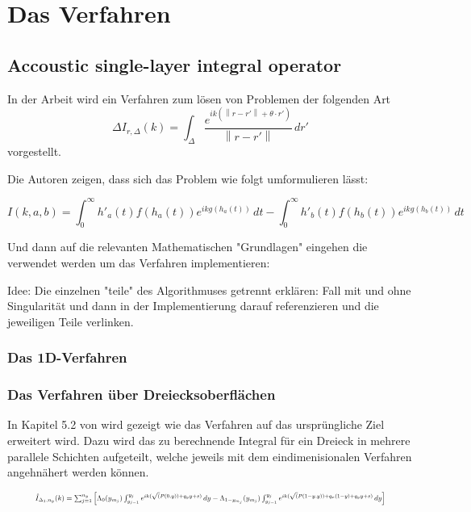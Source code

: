 \chapter{Das Verfahren}

\section{Accoustic single-layer integral operator}

In der Arbeit  wird ein Verfahren zum lösen von Problemen der folgenden Art
\begin{equation}
    \Delta
    I_{r,\Delta}(k) = \int_{\Delta}^{}  \frac{e^{ik(\left\lVert r-r'\right\rVert + \theta \cdot r')}}{\left\lVert r-r'\right\rVert} \,dr'
\end{equation}
vorgestellt.

Die Autoren zeigen, dass sich das Problem wie folgt umformulieren lässt:

\begin{equation}
    I(k,a,b) = \int_{0}^{\infty} h'_a(t)f(h_a(t))e^{ikg(h_a(t))} \,dt - \int_{0}^{\infty} h'_b(t)f(h_b(t))e^{ikg(h_b(t))} \,dt
\end{equation}


Und dann auf die relevanten Mathematischen "Grundlagen" eingehen die verwendet werden um das Verfahren implementieren:

Idee: Die einzelnen "teile" des Algorithmuses getrennt erklären:
Fall mit und ohne Singularität und dann in der Implementierung darauf referenzieren und die jeweiligen Teile verlinken.

\subsection{Das 1D-Verfahren}
\subsection{Das Verfahren über Dreiecksoberflächen}

In Kapitel 5.2 von \cite*{gasperini:hal-03209144} wird gezeigt wie das Verfahren auf das ursprüngliche Ziel erweitert wird.
Dazu wird das zu berechnende Integral für ein Dreieck in mehrere parallele Schichten aufgeteilt, welche jeweils mit dem eindimenisionalen Verfahren angehnähert werden können.

\begin{equation}
    \resizebox{.9\hsize}{!}{$\hat{I}_{\Delta_1,n_y}(k) = \sum_{j = 1}^{n_y} \left[ \Lambda_0(y_{m_j}) \int_{y_{j-1}}^{y_j}  e^{ik(\sqrt(P(0,y))+q_yy+s)}\,dy - \Lambda_{1-y_{m_j}}(y_{m_j}) \int_{y_{j-1}}^{y_j}  e^{ik(\sqrt(P(1-y,y))+q_x(1-y)+q_yy+s)}\,dy  \right]$}
\end{equation}

